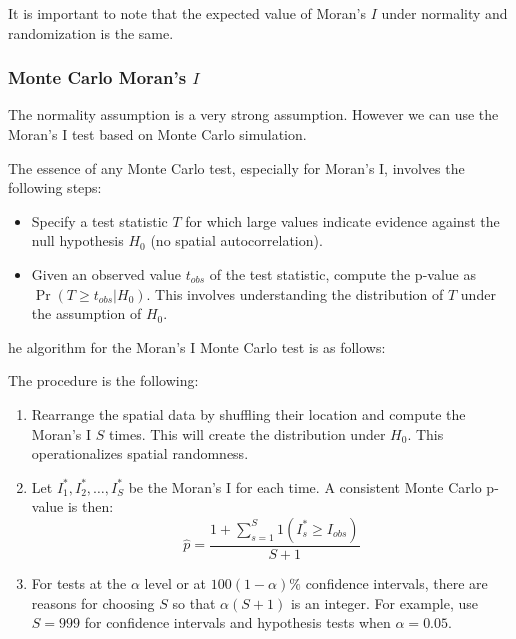 \documentclass[english,12pt]{book}\usepackage[]{graphicx}\usepackage[]{xcolor}
\begin{document}
It is important to note that the expected value of Moran's $I$ under normality and randomization is the same. 

\subsubsection{Monte Carlo Moran's $I$}

The normality assumption is a very strong assumption. However we can use the Moran’s I test based on Monte Carlo simulation.

The essence of any Monte Carlo test, especially for Moran's I, involves the following steps: 

\begin{itemize}
  \item Specify a test statistic $T$ for which large values indicate evidence against the null hypothesis $H_0$ (no spatial autocorrelation).
  \item  Given an observed value $t_{obs}$ of the test statistic, compute the p-value as $\Pr(T\geq t_{obs}|H_0)$. This involves understanding the distribution of $T$ under the assumption of $H_0$.
\end{itemize}

he algorithm for the Moran's I Monte Carlo test is as follows:

\begin{algorithm}
The procedure is the following:

\begin{enumerate}
\item Rearrange the spatial data by shuffling their location and compute the Moran's I $S$ times. This will create the distribution under $H_0$. This operationalizes spatial randomness. 
\item Let $I_1^*, I_2^*,\ldots, I_S^*$ be the Moran's I for each time. A consistent Monte Carlo p-value is then:
  \begin{equation*}
    \widehat{p} = \frac{1 + \sum_{s=1}^S 1(I^*_s \geq I_{obs})}{S + 1}
  \end{equation*}
  \item For tests at the $\alpha$ level or at $100(1- \alpha)\%$ confidence intervals, there are reasons for choosing $S$ so that $\alpha(S + 1)$ is an integer. For example, use $S=999$ for confidence intervals and hypothesis tests when $\alpha = 0.05$.
\end{enumerate}
\end{algorithm}
\end{document}
